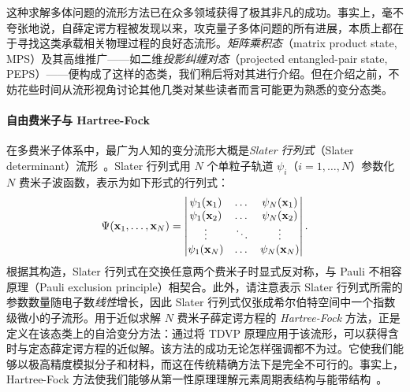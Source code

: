 \bigskip\noindent 这种求解多体问题的流形方法已在众多领域获得了极其非凡的成功。事实上，毫不夸张地说，自薛定谔方程被发现以来，攻克量子多体问题的所有进展，本质上都在于寻找这类承载相关物理过程的良好态流形。\emph{矩阵乘积态}（matrix product state, MPS）及其高维推广——如二维\emph{投影纠缠对态}（projected entangled-pair state, PEPS）——便构成了这样的态类，我们稍后将对其进行介绍。但在介绍之前，不妨花些时间从流形视角讨论其他几类对某些读者而言可能更为熟悉的变分态类。
\paragraph{自由费米子与 Hartree-Fock}
在多费米子体系中，最广为人知的变分流形大概是\emph{Slater 行列式}（Slater determinant）流形~\cite{Slater1929}。Slater 行列式用 $N$ 个单粒子轨道 $\psi_i$（$i=1,\dots,N$）参数化 $N$ 费米子波函数，表示为如下形式的行列式：
\begin{equation}
    \Psi({\bf x}_1,\dots,{\bf x}_N) =
    \begin{vmatrix}
    \psi_1({\bf x}_1) & \dots & \psi_N({\bf x}_1) \\
    \psi_1({\bf x}_2) & \dots & \psi_N({\bf x}_2) \\
    \vdots & \ddots & \vdots \\
    \psi_1({\bf x}_N) & \dots & \psi_N({\bf x}_N)
    \end{vmatrix}.
\end{equation}
根据其构造，Slater 行列式在交换任意两个费米子时显式反对称，与 Pauli 不相容原理（Pauli exclusion principle）相契合。此外，请注意表示 Slater 行列式所需的参数数量随电子数\emph{线性}增长，因此 Slater 行列式仅张成希尔伯特空间中一个指数级微小的子流形。用于近似求解 $N$ 费米子薛定谔方程的 \emph{Hartree-Fock} 方法，正是定义在该态类上的自洽变分方法：通过将 TDVP 原理应用于该流形，可以获得含时与定态薛定谔方程的近似解。该方法的成功无论怎样强调都不为过。它使我们能够以极高精度模拟分子和材料，而这在传统精确方法下是完全不可行的。事实上，Hartree-Fock 方法使我们能够从第一性原理理解元素周期表结构与能带结构~\cite{Slater1935,Hartree1947}。
